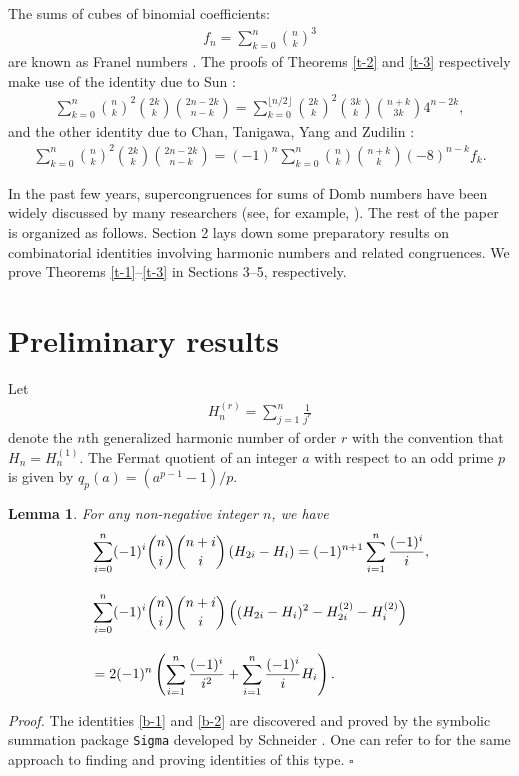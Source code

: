 \documentclass[12pt]{article}
\newtheorem{lem}[thm]{Lemma}
\numberwithin{equation}{section}
\newcommand{\qed}{{\hfill$\square$}\medskip}
\begin{document}
The sums of cubes of binomial coefficients:
\begin{align*}
f_n=\sum_{k=0}^n{n\choose k}^3
\end{align*}
are known as Franel numbers \cite{franel-1984}.
The proofs of Theorems \ref{t-2} and \ref{t-3} respectively make use of 
the identity due to Sun \cite[Lemma 3.1]{sunzh-itsf-2015}:
\begin{align}
\sum_{k=0}^n{n\choose k}^2{2k\choose k}{2n-2k\choose n-k}=\sum_{k=0}^{\lfloor n/2\rfloor}{2k\choose k}^2{3k\choose k}
{n+k\choose 3k}4^{n-2k},\label{a-sunzh}
\end{align}
and the other identity due to Chan, Tanigawa, Yang and Zudilin \cite[(2.27)]{ctyz-am-2011}:
\begin{align}
\sum_{k=0}^n{n\choose k}^2{2k\choose k}{2n-2k\choose n-k}=(-1)^n\sum_{k=0}^n{n\choose k}{n+k\choose k}(-8)^{n-k}f_k.\label{a-ctyz}
\end{align}

In the past few years, supercongruences for sums of Domb numbers have been widely discussed by many researchers (see, for example, \cite{mw-ijnt-2019,ms-ijnt-2018,sunzh-itsf-2015,sunzw-b-2013,zudilin-jnt-2009}).
The rest of the paper is organized as follows. Section 2 lays down some preparatory results
on combinatorial identities involving harmonic numbers and related congruences.
We prove Theorems \ref{t-1}--\ref{t-3} in Sections 3--5, respectively.

\section{Preliminary results}
Let
\begin{align*}
H_n^{(r)}=\sum_{j=1}^n\frac{1}{j^r}
\end{align*}
denote the $n$th generalized harmonic number of order $r$ with the convention that $H_n=H_n^{(1)}$. The Fermat quotient of an integer $a$ with respect to an odd prime $p$ is given by $q_p(a)=(a^{p-1}-1)/p$.

\begin{lem}
For any non-negative integer $n$, we have
\begin{align}
&\sum_{i=0}^n(-1)^i{n\choose i}{n+i\choose i}\left(H_{2i}-H_i\right)=(-1)^{n+1}\sum_{i=1}^n\frac{(-1)^i}{i},\label{b-1}\\[10pt]
&\sum_{i=0}^n(-1)^i{n\choose i}{n+i\choose i}\left((H_{2i}-H_i)^2-H_{2i}^{(2)}-H_i^{(2)}\right)\notag\\[10pt]
&=2(-1)^n\left(\sum_{i=1}^n\frac{(-1)^i}{i^2}+\sum_{i=1}^n\frac{(-1)^i}{i}H_i\right).
\label{b-2}
\end{align}
\end{lem}
{\noindent\it Proof.}
The identities \eqref{b-1} and \eqref{b-2} are discovered and proved by the symbolic summation package {\tt Sigma} developed by Schneider \cite{schneider-slc-2007}. One can refer to \cite{liu-jsc-2019,liu-jmaa-2020} for the same approach to finding and proving identities of this type.
\qed
\end{document}
